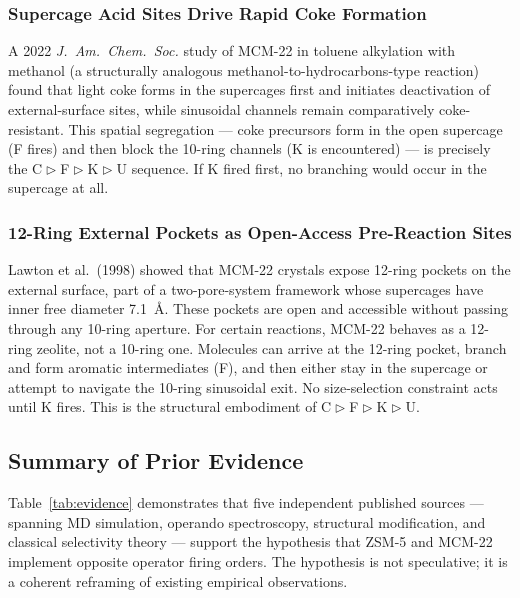 \documentclass[11pt]{article}
\newcommand{\comp}{\mathrel{\triangleright}} %
\begin{document}
\subsubsection{Supercage Acid Sites Drive Rapid Coke Formation}

A 2022 \emph{J.\ Am.\ Chem.\ Soc.} study of MCM-22 in toluene alkylation with methanol (a structurally analogous methanol-to-hydrocarbons-type reaction) found that light coke forms in the supercages first and initiates deactivation of external-surface sites, while sinusoidal channels remain comparatively coke-resistant. This spatial segregation --- coke precursors form in the open supercage (F fires) and then block the 10-ring channels (K is encountered) --- is precisely the C$\comp$F$\comp$K$\comp$U sequence. If K fired first, no branching would occur in the supercage at all.

\subsubsection{12-Ring External Pockets as Open-Access Pre-Reaction Sites}

Lawton et al.\ (1998) showed that MCM-22 crystals expose 12-ring pockets on the external surface, part of a two-pore-system framework whose supercages have inner free diameter 7.1~\AA{}. These pockets are open and accessible without passing through any 10-ring aperture. For certain reactions, MCM-22 behaves as a 12-ring zeolite, not a 10-ring one. Molecules can arrive at the 12-ring pocket, branch and form aromatic intermediates (F), and then either stay in the supercage or attempt to navigate the 10-ring sinusoidal exit. No size-selection constraint acts until K fires. This is the structural embodiment of C$\comp$F$\comp$K$\comp$U.

\subsection{Summary of Prior Evidence}

Table~\ref{tab:evidence} demonstrates that five independent published sources --- spanning MD simulation, operando spectroscopy, structural modification, and classical selectivity theory --- support the hypothesis that ZSM-5 and MCM-22 implement opposite operator firing orders. The hypothesis is not speculative; it is a coherent reframing of existing empirical observations.
\end{document}
